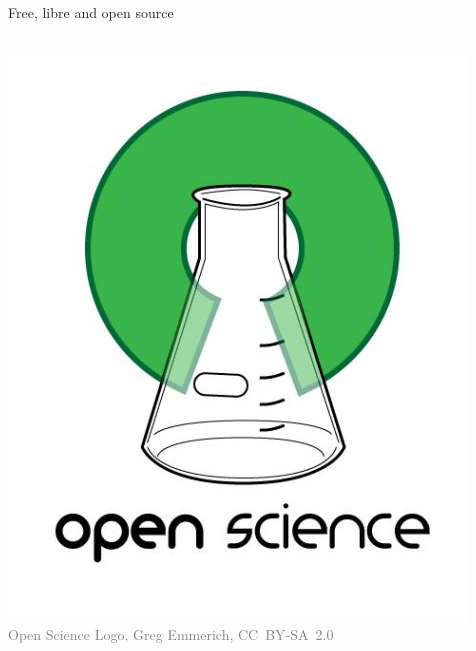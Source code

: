 \documentclass[xcolor={dvipsnames,usenames},beamer,aspectratio=43]{beamer}
\begin{document}
\begin{frame}{Free, libre and open source}
\begin{columns}
\begin{column}{0.3\textwidth}
\begin{center}
  \includegraphics[width=\textwidth]{logos/open_science}
  \\
  \tiny
  \textcolor{gray}{Open Science Logo, Greg Emmerich, CC~BY-SA~2.0}
\end{center}

\end{column}
\end{columns}

\end{frame}
\end{document}
